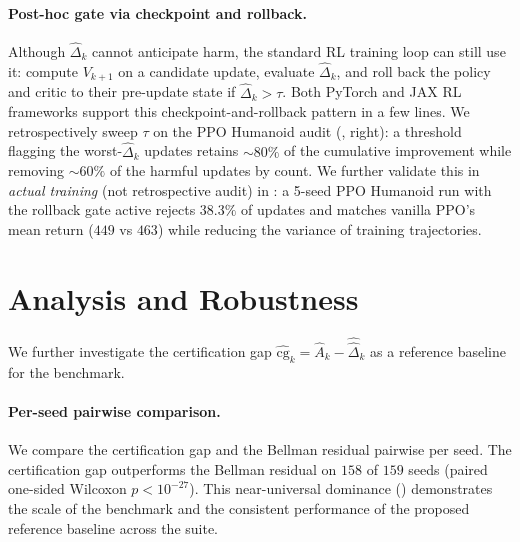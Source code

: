 \documentclass[11pt]{article}
\begin{document}
\paragraph{Post-hoc gate via checkpoint and rollback.}
Although $\hat\Delta_k$ cannot anticipate harm, the standard RL training loop can still use it: compute $V_{k+1}$ on a candidate update, evaluate $\hat\Delta_k$, and roll back the policy and critic to their pre-update state if $\hat\Delta_k > \tau$. Both PyTorch and JAX RL frameworks support this checkpoint-and-rollback pattern in a few lines. We retrospectively sweep $\tau$ on the PPO Humanoid audit (, right): a threshold flagging the worst-$\hat\Delta_k$ updates retains $\sim 80\%$ of the cumulative improvement while removing $\sim 60\%$ of the harmful updates by count. We further validate this in \emph{actual training} (not retrospective audit) in : a 5-seed PPO Humanoid run with the rollback gate active rejects $38.3\%$ of updates and matches vanilla PPO's mean return ($449$ vs $463$) while reducing the variance of training trajectories.

\section{Analysis and Robustness}
\label{sec:analysis}

We further investigate the certification gap $\widehat{\mathrm{cg}}_k = \widehat{A}_k - \widehat{\hat\Delta}_k$ as a reference baseline for the benchmark.

\paragraph{Per-seed pairwise comparison.}
We compare the certification gap and the Bellman residual pairwise per seed. The certification gap outperforms the Bellman residual on $158$ of $159$ seeds (paired one-sided Wilcoxon $p < 10^{-27}$). This near-universal dominance () demonstrates the scale of the benchmark and the consistent performance of the proposed reference baseline across the suite.


\end{document}
